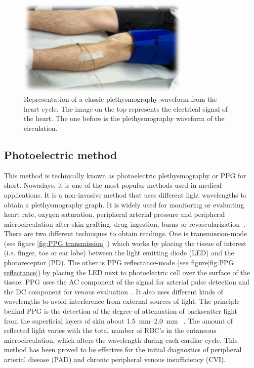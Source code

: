 \begin{figure}[!htpb]
	\centering
	\includegraphics[width=0.75\textwidth,keepaspectratio,trim={0.5cm 0.5cm 0.5cm 0.5cm}, clip]{figure6}    
	\caption[Strain gauge plethysmography]{Representation of a classic plethysmography waveform from the heart cycle. The image on the top represents the electrical signal of the heart. The one before is the plethysmography waveform of the circulation.}
	\label{fig:strain gauge}
\end{figure}


\subsection{Photoelectric method}
\label{section literature 3.4}
This method is technically known as photoelectric plethysmography or PPG for short. Nowadays, it is one of the most popular methods used in medical applications. It is a non-invasive method that uses different light wavelengths to obtain a plethysmography graph. It is widely used for monitoring or evaluating heart rate, oxygen saturation, peripheral arterial pressure and peripheral microcirculation after skin grafting, drug ingestion, burns or revascularization~\cite{holohan1996plethysmography}. There are two different techniques to obtain readings. One is transmission-mode (see figure \ref{fig:PPG transmission}.) which works by placing the tissue of interest (i.e. finger, toe or ear lobe) between the light emitting diode (LED) and the photoreceptor (PD).  The other is PPG reflectance-mode (see figure\ref{fig:PPG reflectance}) by placing the LED next to photoelectric cell over the surface of the tissue. PPG uses the AC component of the signal for arterial pulse detection and the DC component for venous evaluation~\cite{higgins1986photoplethysmographic}. It also uses different kinds of wavelengths to avoid interference from external sources of light. The principle behind PPG is the detection of the degree of attenuation of backscatter light from the superficial layers of skin about \SIrange{1.5}{2.0}{\milli\meter} ~\cite{holohan1996plethysmography,kim1986pulse,bashkatov2005optical}. The amount of reflected light varies with the total number of RBC’s in the cutaneous microcirculation, which alters the wavelength during each cardiac cycle. This method has been proved to be effective for the initial diagnostics of peripheral arterial disease (PAD) and chronic peripheral venous insufficiency (CVI).

